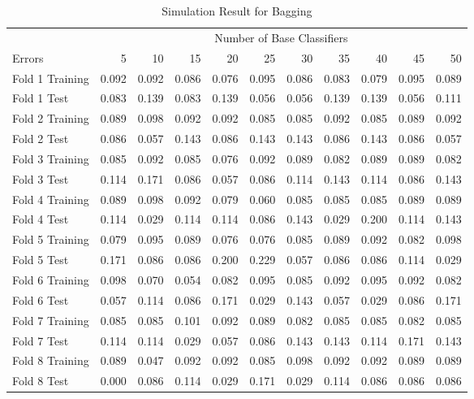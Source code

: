 \documentclass[12pt,oneside,a4paper]{article}
\begin{document}
\begin{table}[ht]
\centering
\caption{Simulation Result for Bagging}
\begin{tabular}{lrrrrrrrrrr}
  \toprule
 & \multicolumn{10}{c}{Number of Base Classifiers}\\
 \cmidrule[0.05em]{2-11}
Errors & 5 & 10 & 15 & 20 & 25 & 30 & 35 & 40 & 45 & 50 \\
  \midrule
Fold 1 Training & 0.092 & 0.092 & 0.086 & 0.076 & 0.095 & 0.086 & 0.083 & 0.079 & 0.095 & 0.089 \\
  Fold 1 Test & 0.083 & 0.139 & 0.083 & 0.139 & 0.056 & 0.056 & 0.139 & 0.139 & 0.056 & 0.111 \\
  Fold 2 Training & 0.089 & 0.098 & 0.092 & 0.092 & 0.085 & 0.085 & 0.092 & 0.085 & 0.089 & 0.092 \\
  Fold 2 Test & 0.086 & 0.057 & 0.143 & 0.086 & 0.143 & 0.143 & 0.086 & 0.143 & 0.086 & 0.057 \\
  Fold 3 Training & 0.085 & 0.092 & 0.085 & 0.076 & 0.092 & 0.089 & 0.082 & 0.089 & 0.089 & 0.082 \\
  Fold 3 Test & 0.114 & 0.171 & 0.086 & 0.057 & 0.086 & 0.114 & 0.143 & 0.114 & 0.086 & 0.143 \\
  Fold 4 Training & 0.089 & 0.098 & 0.092 & 0.079 & 0.060 & 0.085 & 0.085 & 0.085 & 0.089 & 0.089 \\
  Fold 4 Test & 0.114 & 0.029 & 0.114 & 0.114 & 0.086 & 0.143 & 0.029 & 0.200 & 0.114 & 0.143 \\
  Fold 5 Training & 0.079 & 0.095 & 0.089 & 0.076 & 0.076 & 0.085 & 0.089 & 0.092 & 0.082 & 0.098 \\
  Fold 5 Test & 0.171 & 0.086 & 0.086 & 0.200 & 0.229 & 0.057 & 0.086 & 0.086 & 0.114 & 0.029 \\
  Fold 6 Training & 0.098 & 0.070 & 0.054 & 0.082 & 0.095 & 0.085 & 0.092 & 0.095 & 0.092 & 0.082 \\
  Fold 6 Test & 0.057 & 0.114 & 0.086 & 0.171 & 0.029 & 0.143 & 0.057 & 0.029 & 0.086 & 0.171 \\
  Fold 7 Training & 0.085 & 0.085 & 0.101 & 0.092 & 0.089 & 0.082 & 0.085 & 0.085 & 0.082 & 0.085 \\
  Fold 7 Test & 0.114 & 0.114 & 0.029 & 0.057 & 0.086 & 0.143 & 0.143 & 0.114 & 0.171 & 0.143 \\
  Fold 8 Training & 0.089 & 0.047 & 0.092 & 0.092 & 0.085 & 0.098 & 0.092 & 0.092 & 0.089 & 0.089 \\
  Fold 8 Test & 0.000 & 0.086 & 0.114 & 0.029 & 0.171 & 0.029 & 0.114 & 0.086 & 0.086 & 0.086 \\

\end{tabular}
\end{table}
\end{document}
